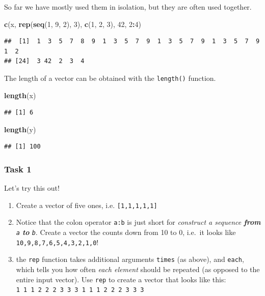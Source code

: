 \documentclass[]{book}
\newenvironment{Shaded}{\begin{snugshade}}{\end{snugshade}}
\newcommand{\KeywordTok}[1]{\textcolor[rgb]{0.13,0.29,0.53}{\textbf{#1}}}
\newcommand{\DecValTok}[1]{\textcolor[rgb]{0.00,0.00,0.81}{#1}}
\newcommand{\OperatorTok}[1]{\textcolor[rgb]{0.81,0.36,0.00}{\textbf{#1}}}
\newcommand{\NormalTok}[1]{#1}
\providecommand{\tightlist}{%
  \setlength{\itemsep}{0pt}\setlength{\parskip}{0pt}}
\theoremstyle{definition}
\theoremstyle{definition}
\theoremstyle{definition}
\theoremstyle{remark}
\begin{document}
So far we have mostly used them in isolation, but they are often used
together.

\begin{Shaded}
\begin{Highlighting}[]
\KeywordTok{c}\NormalTok{(x, }\KeywordTok{rep}\NormalTok{(}\KeywordTok{seq}\NormalTok{(}\DecValTok{1}\NormalTok{, }\DecValTok{9}\NormalTok{, }\DecValTok{2}\NormalTok{), }\DecValTok{3}\NormalTok{), }\KeywordTok{c}\NormalTok{(}\DecValTok{1}\NormalTok{, }\DecValTok{2}\NormalTok{, }\DecValTok{3}\NormalTok{), }\DecValTok{42}\NormalTok{, }\DecValTok{2}\OperatorTok{:}\DecValTok{4}\NormalTok{)}
\end{Highlighting}
\end{Shaded}

\begin{verbatim}
##  [1]  1  3  5  7  8  9  1  3  5  7  9  1  3  5  7  9  1  3  5  7  9  1  2
## [24]  3 42  2  3  4
\end{verbatim}

The length of a vector can be obtained with the \texttt{length()}
function.

\begin{Shaded}
\begin{Highlighting}[]
\KeywordTok{length}\NormalTok{(x)}
\end{Highlighting}
\end{Shaded}

\begin{verbatim}
## [1] 6
\end{verbatim}

\begin{Shaded}
\begin{Highlighting}[]
\KeywordTok{length}\NormalTok{(y)}
\end{Highlighting}
\end{Shaded}

\begin{verbatim}
## [1] 100
\end{verbatim}

\subsubsection{Task 1}\label{task-1}

Let's try this out!

\begin{enumerate}
\def\labelenumi{\arabic{enumi}.}
\tightlist
\item
  Create a vector of five ones, i.e. \texttt{{[}1,1,1,1,1{]}}
\item
  Notice that the colon operator \texttt{a:b} is just short for
  \emph{construct a sequence \textbf{from} \texttt{a} \textbf{to}
  \texttt{b}}. Create a vector the counts down from 10 to 0, i.e.~it
  looks like \texttt{10,9,8,7,6,5,4,3,2,1,0}!
\item
  the \texttt{rep} function takes additional arguments \texttt{times}
  (as above), and \texttt{each}, which tells you how often \emph{each
  element} should be repeated (as opposed to the entire input vector).
  Use \texttt{rep} to create a vector that looks like this:
  \texttt{1\ 1\ 1\ 2\ 2\ 2\ 3\ 3\ 3\ 1\ 1\ 1\ 2\ 2\ 2\ 3\ 3\ 3}
\end{enumerate}
\end{document}
